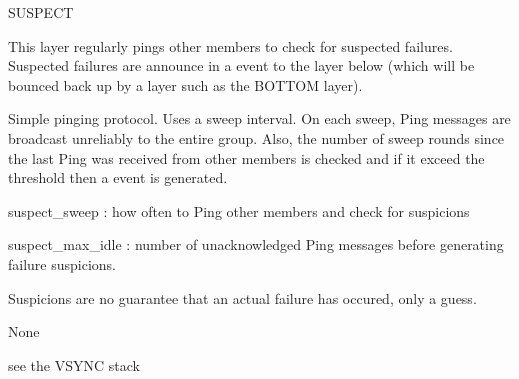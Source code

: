 \begin{Layer}{SUSPECT}

This layer regularly pings other members to check for suspected
failures.  Suspected failures are announce in a  event to
the layer below (which will be bounced back up by a layer such as the
BOTTOM layer).

\begin{Protocol}
Simple pinging protocol.  Uses a sweep interval.  On each sweep, Ping
messages are broadcast unreliably to the entire group.  Also, the
number of sweep rounds since the last Ping was received from other
members is checked and if it exceed the  threshold
then a  event is generated.  
\end{Protocol}

\begin{Parameters}
\item 
suspect\_sweep : how often to Ping other members and check for suspicions
\item
suspect\_max\_idle : number of unacknowledged Ping messages before generating
failure suspicions.
\end{Parameters}

\begin{Properties}
\item
Suspicions are no guarantee that an actual failure has occured, only a guess.
\end{Properties}

\begin{Notes}
\item None
\end{Notes}

\begin{Sources}
\end{Sources}

\begin{GenEvent}
\end{GenEvent}

\begin{Testing}
\item see the VSYNC stack
\end{Testing}
\end{Layer}
